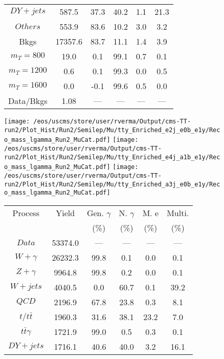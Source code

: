 \begin{figure}
\begin{minipage}[c]{0.32\textwidth}
{\begin{tabular}{cccccc}
$ DY+jets $ &  587.5 &  37.3 &  40.2 &  1.1 &  21.3\\
$ Others $ &  553.9 &  83.6 &  10.2 &  3.0 &  3.2\\
Bkgs &  17357.6 &  83.7 &  11.1 &  1.4 &  3.9\\
$ m_{T} = 800 $ &  19.0 &  0.1 &  99.1 &  0.7 &  0.1\\
$ m_{T} = 1200 $ &  0.6 &  0.1 &  99.3 &  0.0 &  0.5\\
$ m_{T} = 1600 $ &  0.0 &  -0.1 &  99.6 &  0.5 &  0.0\\
Data/Bkgs &  1.08 &  --- &  --- &  --- &  ---\\
\hline
\end{tabular}
}
\end{minipage}
\end{figure}

\begin{figure}
\centering
\texttt{[image: /eos/uscms/store/user/rverma/Output/cms-TT-run2/Plot\_Hist/Run2/Semilep/Mu/tty\_Enriched\_e2j\_e0b\_e1y/Reco\_mass\_lgamma\_Run2\_MuCat.pdf]}
\texttt{[image: /eos/uscms/store/user/rverma/Output/cms-TT-run2/Plot\_Hist/Run2/Semilep/Mu/tty\_Enriched\_e4j\_a1b\_e1y/Reco\_mass\_lgamma\_Run2\_MuCat.pdf]}
\texttt{[image: /eos/uscms/store/user/rverma/Output/cms-TT-run2/Plot\_Hist/Run2/Semilep/Mu/tty\_Enriched\_a3j\_e0b\_e1y/Reco\_mass\_lgamma\_Run2\_MuCat.pdf]}
\begin{minipage}[c]{0.32\textwidth}
\centering
\tiny{
\begin{tabular}{cccccc}
\hline
Process & Yield & Gen. $\gamma$ & N. $\gamma$ & M. e & Multi. \\
 &  & (\%) & (\%) & (\%) & (\%)  \\
\hline
                                                                      $ Data $ &  53374.0 &  --- &  --- &  --- &  ---\\
$ W+\gamma $ &  26232.3 &  99.8 &  0.1 &  0.0 &  0.1\\
$ Z+\gamma $ &  9964.8 &  99.8 &  0.2 &  0.0 &  0.1\\
$ W+jets $ &  4040.5 &  0.0 &  60.7 &  0.1 &  39.2\\
$ QCD $ &  2196.9 &  67.8 &  23.8 &  0.3 &  8.1\\
$ t/t\bar{t} $ &  1960.3 &  31.6 &  38.1 &  23.2 &  7.0\\
$ t\bar{t}\gamma $ &  1721.9 &  99.0 &  0.5 &  0.3 &  0.1\\
$ DY+jets $ &  1716.1 &  40.6 &  40.0 &  3.2 &  16.1\\

\end{tabular}}
\end{minipage}
\end{figure}
